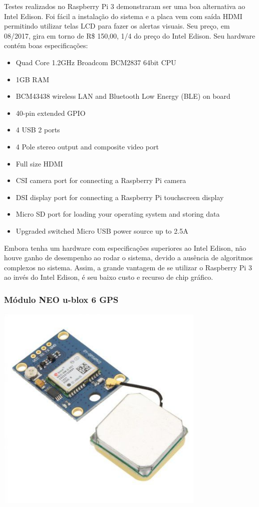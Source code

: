 \documentclass[a4paper, 12pt]{article}
\begin{document}
Testes realizados no Raspberry Pi 3 demonstraram ser uma boa alternativa ao Intel Edison. Foi fácil a instalação do sistema e a placa vem com saída HDMI permitindo utilizar telas LCD para fazer os alertas visuais.
Seu preço, em 08/2017, gira em torno de R\$ 150,00, 1/4 do preço do Intel Edison. Seu hardware contém boas especificações:

\begin{itemize}
\item Quad Core 1.2GHz Broadcom BCM2837 64bit CPU
\item 1GB RAM
\item BCM43438 wireless LAN and Bluetooth Low Energy (BLE) on board
\item 40-pin extended GPIO
\item 4 USB 2 ports
\item 4 Pole stereo output and composite video port
\item Full size HDMI
\item CSI camera port for connecting a Raspberry Pi camera
\item DSI display port for connecting a Raspberry Pi touchscreen display
\item Micro SD port for loading your operating system and storing data
\item Upgraded switched Micro USB power source up to 2.5A
\end{itemize}

Embora tenha um hardware com especificações superiores ao Intel Edison, não houve ganho de desempenho ao rodar o sistema, devido a ausência de algoritmos complexos no sistema. Assim, a grande vantagem de se utilizar o Raspberry Pi 3 ao invés do Intel Edison, é seu baixo custo e recurso de chip gráfico.

\subsubsection{Módulo NEO u-blox 6 GPS}

\includegraphics[width=10cm, center]{images/neo-6m}
\end{document}
